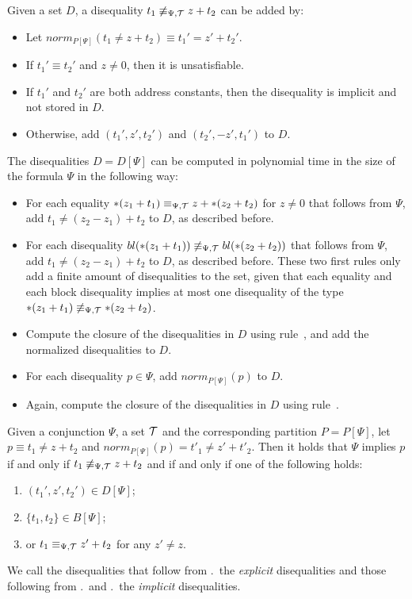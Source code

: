 Given a set $D$, a disequality $t_1 \not\equiv_{\Psi,\mathcal{T}} z + t_2$ can be added by:
\begin{itemize}
\item Let $norm_{P[\Psi]}(t_1 \neq z + t_2) \equiv t_1' = z' + t_2'$.
\item If $t_1' \equiv t_2'$ and $z \neq 0$, then it is unsatisfiable.
\item If $t_1'$ and $t_2'$ are both address constants, then the disequality is implicit and not stored in $D$.
\item Otherwise, add $(t_1', z', t_2')$ and $(t_2', -z', t_1')$ to $D$.
\end{itemize}

The disequalities $D = D[\Psi]$ can be computed in polynomial time in the size of the formula $\Psi$ in the following way:

\begin{itemize}
    \item For each equality $*(z_1 + t_1) \equiv_{\Psi,\mathcal{T}} z + *(z_2 + t_2)$ for $z \neq 0$
          that follows from $\Psi$,
          add $t_1 \neq (z_2 - z_1) + t_2$ to $D$, as described before.
    \item For each disequality $bl(*(z_1 + t_1)) \not\equiv_{\Psi,\mathcal{T}} bl(*(z_2 + t_2))$ that follows from $\Psi$, add $t_1 \neq (z_2 - z_1) + t_2$ to $D$, as described before.
          These two first rules only add a finite amount of disequalities to the set, given that each equality and each block disequality implies at most one disequality of the type $*(z_1 + t_1) \not\equiv_{\Psi,\mathcal{T}} *(z_2 + t_2)$.
    \item Compute the closure of the disequalities in $D$ using rule~, and add the normalized disequalities to $D$.
    \item For each disequality $p \in \Psi$, add $norm_{P[\Psi]}(p)$ to $D$.
    \item Again, compute the closure of the disequalities in $D$ using rule~.
\end{itemize}

Given a conjunction $\Psi$, a set $\mathcal{T}$ and the corresponding partition $P = P[\Psi]$, let $p \equiv t_1 \neq z + t_2$ and $norm_{P[\Psi]}(p) = t'_1 \neq z' + t'_2$.
Then
it holds that $\Psi$ implies $p$ if and only if $t_1 \not\equiv_{\Psi,\mathcal{T}} z + t_2$ and if and only if one of the following holds:

\begin{enumerate}
    \item\label{item:diseqs} $(t_1',z', t_2') \in D[\Psi]$;
    \item\label{item:bl-diseqs} $\{t_1,t_2\} \in B[\Psi]$;
    \item\label{item:eqs} or $t_1 \equiv_{\Psi,\mathcal{T}} z' + t_2$ for any $z' \neq z$.
\end{enumerate}
We call the disequalities that follow from .\ the \emph{explicit} disequalities and those following from .\ and .\ the \emph{implicit} disequalities.
